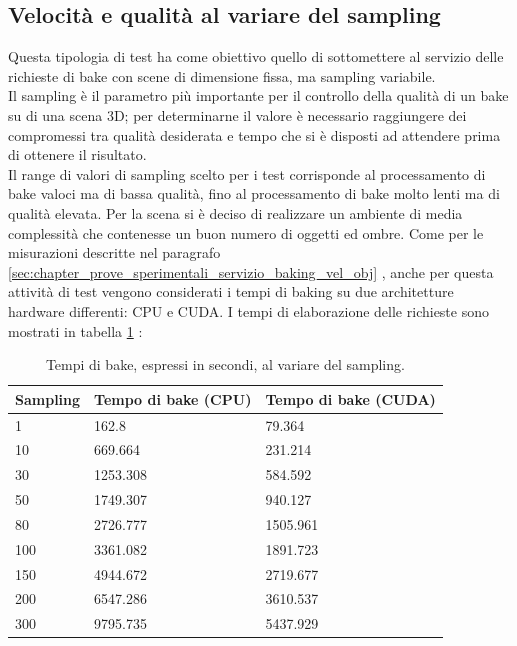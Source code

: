 \subsection{Velocità e qualità al variare del sampling}
\label{sec:chapter_prove_sperimentali_servizio_baking_vel_sam}

Questa tipologia di test ha come obiettivo quello di sottomettere al servizio delle richieste di bake con scene di dimensione fissa, ma sampling variabile. 
\\
Il sampling è il parametro più importante per il controllo della qualità di un bake su di una scena 3D; per determinarne il valore è necessario raggiungere dei compromessi tra qualità desiderata e tempo che si è disposti ad attendere prima di ottenere il risultato. 
\\
Il range di valori di sampling scelto per i test corrisponde al processamento di  bake valoci ma di bassa qualità, fino al processamento di bake molto lenti ma di qualità elevata. Per la scena si è deciso di realizzare un ambiente di media complessità che contenesse un buon numero di oggetti ed ombre. Come per le misurazioni descritte nel paragrafo \ref{sec:chapter_prove_sperimentali_servizio_baking_vel_obj} , anche per questa attività di test vengono considerati i tempi di baking su due architetture hardware differenti: CPU e CUDA.
I tempi di elaborazione delle richieste sono mostrati in tabella \ref{table:per_samp} :
\newpage
\begin{table}[]
\centering
\caption[Performance al variare del sampling]{Tempi di bake, espressi in secondi, al variare del sampling.}
\begin{tabular}{|l|l|l|}
\hline
\textbf{Sampling} & \textbf{Tempo di bake (CPU)} & \textbf{Tempo di bake (CUDA)} \\ \hline
1 & 162.8 & 79.364 \\ \hline
10 & 669.664 & 231.214 \\ \hline
30 & 1253.308 & 584.592 \\ \hline
50 & 1749.307 & 940.127 \\ \hline
80 & 2726.777 & 1505.961 \\ \hline
100 & 3361.082 & 1891.723 \\ \hline
150 & 4944.672 & 2719.677 \\ \hline
200 & 6547.286 & 3610.537 \\ \hline
300 & 9795.735 & 5437.929 \\ \hline
\end{tabular}
\label{table:per_samp}
\end{table}
